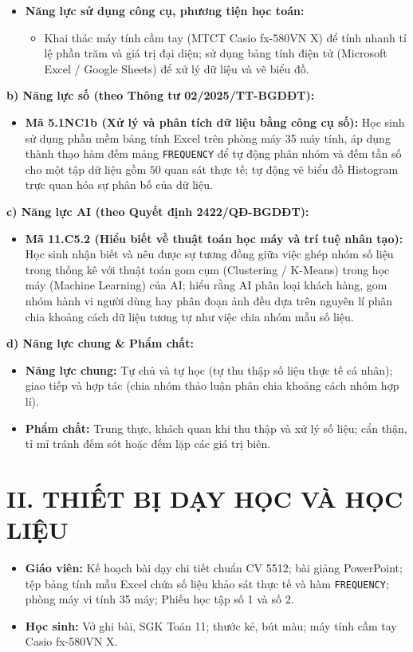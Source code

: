\documentclass[12pt, a4paper]{article}
\begin{document}
\begin{itemize}[leftmargin=1.5em]
\begin{itemize}
    \end{itemize}
    \item \textbf{Năng lực sử dụng công cụ, phương tiện học toán:}
    \begin{itemize}
        \item Khai thác máy tính cầm tay (MTCT Casio fx-580VN X) để tính nhanh tỉ lệ phần trăm và giá trị đại diện; sử dụng bảng tính điện tử (Microsoft Excel / Google Sheets) để xử lý dữ liệu và vẽ biểu đồ.
    \end{itemize}
\end{itemize}

\textbf{b) Năng lực số (theo Thông tư 02/2025/TT-BGDĐT):}
\begin{itemize}[leftmargin=1.5em]
    \item \textbf{Mã 5.1NC1b (Xử lý và phân tích dữ liệu bằng công cụ số):} Học sinh sử dụng phần mềm bảng tính Excel trên phòng máy 35 máy tính, áp dụng thành thạo hàm đếm mảng \texttt{FREQUENCY} để tự động phân nhóm và đếm tần số cho một tập dữ liệu gồm $50$ quan sát thực tế; tự động vẽ biểu đồ Histogram trực quan hóa sự phân bố của dữ liệu.
\end{itemize}

\textbf{c) Năng lực AI (theo Quyết định 2422/QĐ-BGDĐT):}
\begin{itemize}[leftmargin=1.5em]
    \item \textbf{Mã 11.C5.2 (Hiểu biết về thuật toán học máy và trí tuệ nhân tạo):} Học sinh nhận biết và nêu được sự tương đồng giữa việc ghép nhóm số liệu trong thống kê với thuật toán gom cụm (Clustering / K-Means) trong học máy (Machine Learning) của AI; hiểu rằng AI phân loại khách hàng, gom nhóm hành vi người dùng hay phân đoạn ảnh đều dựa trên nguyên lí phân chia khoảng cách dữ liệu tương tự như việc chia nhóm mẫu số liệu.
\end{itemize}

\textbf{d) Năng lực chung \& Phẩm chất:}
\begin{itemize}[leftmargin=1.5em]
    \item \textbf{Năng lực chung:} Tự chủ và tự học (tự thu thập số liệu thực tế cá nhân); giao tiếp và hợp tác (chia nhóm thảo luận phân chia khoảng cách nhóm hợp lí).
    \item \textbf{Phẩm chất:} Trung thực, khách quan khi thu thập và xử lý số liệu; cẩn thận, tỉ mỉ tránh đếm sót hoặc đếm lặp các giá trị biên.
\end{itemize}

\section*{II. THIẾT BỊ DẠY HỌC VÀ HỌC LIỆU}
\begin{itemize}[leftmargin=1.5em]
    \item \textbf{Giáo viên:} Kế hoạch bài dạy chi tiết chuẩn CV 5512; bài giảng PowerPoint; tệp bảng tính mẫu Excel chứa số liệu khảo sát thực tế và hàm \texttt{FREQUENCY}; phòng máy vi tính 35 máy; Phiếu học tập số 1 và số 2.
    \item \textbf{Học sinh:} Vở ghi bài, SGK Toán 11; thước kẻ, bút màu; máy tính cầm tay Casio fx-580VN X.
\end{itemize}
\end{document}
